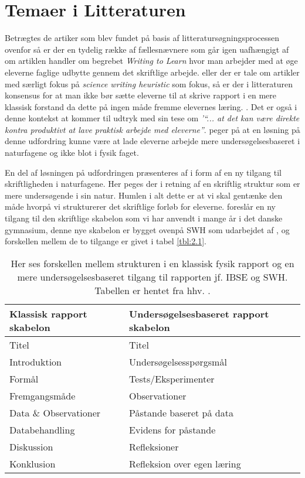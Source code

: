 \section{Temaer i Litteraturen}
\label{sec:2.2}

Betrægtes de artiker som blev fundet på basis af litteratursøgningsprocessen ovenfor så er der en tydelig række af fællesnævnere som går igen uafhængigt af om artiklen handler om begrebet \emph{Writing to Learn} hvor man arbejder med at øge eleverne faglige udbytte gennem det skriftlige arbejde. eller der er tale om artikler med særligt fokus på \emph{science writing heuristic} som fokus, så er der i litteraturen konsensus for at man ikke bør sætte eleverne til at skrive rapport i en mere klassisk forstand da dette på ingen måde fremme elevernes læring. \citep{Akkus2007, Atasoy2013, Burke2005, Keys1999}. Det er også i denne kontekst at \citet{Hodson2008} kommer til udtryk med sin tese om \emph{'``... at det kan være direkte kontra produktivt at lave praktisk arbejde med eleverne''}. \citet{Krogh2016,Dolin2014} peger på at en løsning på denne udfordring kunne være at lade eleverne arbejde mere undersøgelsesbaseret i naturfagene og ikke blot i fysik faget. 

En del af løsningen på udfordringen præsenteres af \citep{Keys1999, Burke2005} i form af en ny tilgang til skriftligheden i naturfagene. Her peges der i retning af en skriftlig struktur som er mere undersøgende i sin natur. Humlen i alt dette er at vi skal gentænke den måde hvorpå vi strukturerer det skriftlige forløb for eleverne. \citet{Burke2005} foreslår en ny tilgang til den skriftlige skabelon som vi har anvendt i mange år i det danske gymnasium, denne nye skabelon er bygget ovenpå SWH som udarbejdet af \citep{Keys1999}, og forskellen mellem de to tilgange er givet i tabel \vref{tbl:2.1}.

\begin{table}
	\centering
	\caption{ Her ses forskellen mellem strukturen i en klassisk fysik rapport og en mere undersøgelsesbaseret tilgang til rapporten jf. IBSE og SWH. Tabellen er hentet fra hhv. 
	\citet{Burke2005, Keys1999}.}
	\label{tbl:2.1}
	\begin{tabular}{@{ } l l @{ }}
		\toprule[2.5pt]
			Klassisk rapport  skabelon & Undersøgelsesbaseret rapport skabelon\\
		\midrule[1.25pt]
			Titel				&	Titel\\
			Introduktion			&	Undersøgelsesspørgsmål\\
			Formål			& 	Tests/Eksperimenter\\
			Fremgangsmåde		&	Observationer\\
			Data \& Observationer	&	Påstande baseret på data\\
			Databehandling		&	Evidens for påstande\\
			Diskussion			&	Refleksioner\\
			Konklusion			&	Refleksion over egen læring\\
		\bottomrule[2.5pt]
	\end{tabular}
\end{table}

